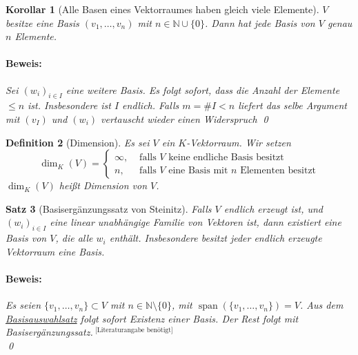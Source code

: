 \documentclass{report}
\newcommand{\IN}[1]{\index{#1|BH}}
\newcommand{\N}{\mathbb{N}}
\DeclareMathOperator{\Span}{span}
\theoremstyle{customrem}
\theoremstyle{customdef}
\newtheorem{definition}{Definition}[chapter]
\newtheorem{korrolar}[definition]{Korollar}
\newtheorem{satz}[definition]{Satz}
\renewenvironment{proof}{\paragraph{Beweis: }}{\qed}
\begin{document}
	\begin{korrolar}[Alle Basen eines Vektorraumes haben gleich viele Elemente]
		$V$ besitze eine Basis $(v_1, \dots, v_n)$ mit $n \in \N \cup \{0\}$. Dann hat jede Basis von $V$ genau $n$ Elemente.\\
		
		\begin{proof}
			Sei $(w_i)_{i \in I}$ eine weitere Basis. Es folgt sofort, dass die Anzahl der Elemente $\le n$ ist. Insbesondere ist $I$ endlich. Falls $m = \#I < n$ liefert das selbe Argument mit $(v_I)$ und $(w_i)$ vertauscht wieder einen Widerspruch \Lightning
		\end{proof}
	\end{korrolar}
	\vspace{.25cm}
	\begin{definition}[Dimension]
		\IN{Dimension}
		Es sei $V$ ein $K$-Vektorraum. Wir setzen
		$$\dim_K(V) = \begin{cases}\infty,&\text{ falls $V$ keine endliche Basis besitzt}\\n,&\text{ falls $V$ eine Basis mit $n$ Elementen besitzt}\end{cases}$$
		$\dim_K(V)$ heißt Dimension von $V$.
	\end{definition}
	
	\begin{satz}[Basisergänzungssatz von Steinitz]
		\label{satz218}
		Falls $V$ endlich erzeugt ist, und $(w_i)_{i \in I}$ eine linear unabhängige Familie von Vektoren ist, dann existiert eine Basis von $V$, die alle $w_i$ enthält. Insbesondere besitzt jeder endlich erzeugte Vektorraum eine Basis.\\
		
		\begin{proof}
			Es seien $\{v_1, \dots, v_n\} \subset V$ mit $n \in \N \setminus\{0\}$, mit $\Span(\{v_1, \dots, v_n\}) = V$. Aus dem \hyperref[satz213]{Basisauswahlsatz} folgt sofort Existenz einer Basis. Der Rest folgt mit Basisergänzungssatz.$^{\text{ [Literaturangabe benötigt]}}$\\
		\end{proof}
	\end{satz}
	
\end{document}
